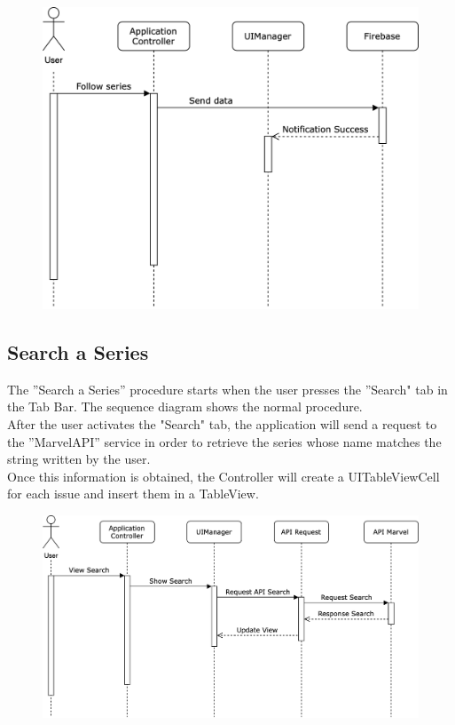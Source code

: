 \begin{figure}[h]
\centering
\includegraphics[width=\textwidth]{img/seqdiagrams/followseries}
\end{figure}

\clearpage

\subsection{Search a Series}
The ”Search a Series” procedure starts when the user presses the ”Search" tab in the Tab Bar. The sequence diagram shows the normal procedure. \\
After the user activates the "Search" tab, the application will send a request to the ”MarvelAPI” service in order to retrieve the series whose name matches the string written by the user. \\
Once this information is obtained, the Controller will create a UITableViewCell for each issue and insert them in a TableView. 

\vspace{5mm}

\begin{figure}[h]
\centering
\includegraphics[width=\textwidth]{img/seqdiagrams/searchseries}
\end{figure}


